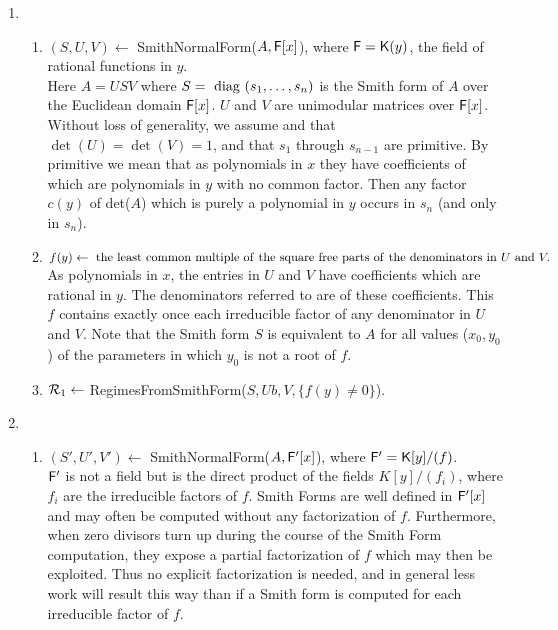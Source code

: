\documentclass[10pt]{article}
\begin{document}
\begin{enumerate}
\item
\begin{enumerate}
\item
$(S, U, V) \leftarrow $ SmithNormalForm($A, {\mathsf F}[x]$),
where ${\mathsf F} = {\mathsf K}(y)$, the field of rational functions in $y$.\\[0.2cm] 
\bc
Here $A=USV$ where $S = ~\mbox{diag}~(s_1, \ldots, s_n)$ is the Smith form of $A$ over the Euclidean domain ${\mathsf F}[x]$.
$U$ and $V$ are unimodular matrices over ${\mathsf F}[x]$.  Without loss of generality, we assume and that 
$\det(U) = \det(V) = 1$, 
and that $s_1$ through $s_{n-1}$ 
are primitive.  By primitive we mean that as polynomials in $x$ they have coefficients of which are polynomials in $y$ with no common
factor.  Then any factor $c(y)$ of det($A$) which is purely a polynomial in $y$ occurs in $s_n$
(and only in $s_n$).
\ec
\item
$f(y) \leftarrow {\rm ~the~least~common~multiple~of~the~square~free~parts~of~the~denominators~in~}
U ~\mbox{and}~ V.$\\[0.2cm]
\bc As polynomials in $x$, the entries in $U$ and $V$ have coefficients which
are rational in $y$.  The denominators referred to are of these coefficients. 
This $f$ contains exactly once each irreducible factor of any denominator in $U$ and $V$. Note that 
the Smith form $S$ is equivalent to $A$ for all values ($x_0, y_0$) of the parameters in which $y_0$ is not a root of $f$. \ec

\item 
${\cal R}_1 \leftarrow$ RegimesFromSmithForm($S, Ub, V, \{f(y) \neq 0\}$).
\end{enumerate}

\item
\begin{enumerate}
\item
$(S', U', V') \leftarrow $ SmithNormalForm($A, {\mathsf F}'[x]$),
where ${\mathsf F}' = {\mathsf K}[y]/(f)$.\\[0.2cm]
\bc ${\mathsf F}'$ is not a field but is the direct product of the fields $K[y]/(f_i)$, 
where $f_i$ are the irreducible factors of $f$.  Smith Forms are well defined in ${\mathsf F}'[x]$ and may often
be computed without any factorization of $f$.  Furthermore, when zero divisors turn up during the course of the
Smith Form computation, they expose a partial factorization of $f$ which may then be exploited.  Thus no explicit
factorization is needed, and in general less work will result this way than if a Smith form is computed for each 
irreducible factor of $f$. \ec


\end{enumerate}
\end{enumerate}
\end{document}
